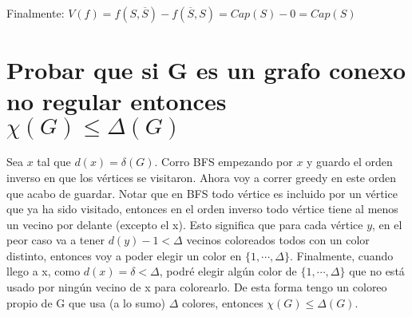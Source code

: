 \documentclass[11pt]{article}
\begin{document}
Finalmente: \(V(f) = f(S, \overline{S}) - f(\overline{S}, S) = Cap(S) - 0 = Cap(S)\)


\section{Probar que si G es un grafo conexo no regular entonces \(\chi(G) \le \Delta(G)\)}
\label{sec:orgfec3829}
Sea \(x\) tal que \(d(x) = \delta(G)\). Corro BFS empezando por \(x\) y guardo el orden inverso en que los vértices se visitaron. Ahora voy a correr greedy en este orden que acabo de guardar. Notar que en BFS todo vértice es incluido por un vértice que ya ha sido visitado, entonces en el orden inverso todo vértice tiene al menos un vecino por delante (excepto el x). Esto significa que para cada vértice \(y\), en el peor caso va a tener \(d(y)-1 < \Delta\) vecinos coloreados todos con un color distinto, entonces voy a poder elegir un color en \(\{1,\cdots, \Delta\}\). Finalmente, cuando llego a x, como \(d(x)=\delta<\Delta\), podré elegir algún color de \(\{1,\cdots, \Delta\}\) que no está usado por ningún vecino de x para colorearlo. De esta forma tengo un coloreo propio de G que usa (a lo sumo) \(\Delta\) colores, entonces \(\chi(G) \le \Delta(G)\).
\end{document}
